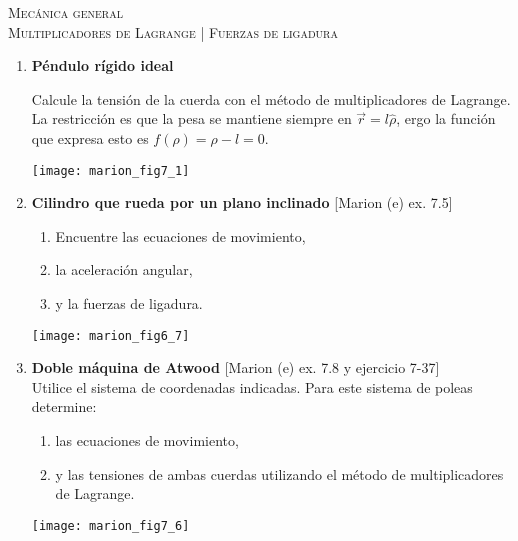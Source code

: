 \documentclass[11pt,spanish,a4paper]{article}
\begin{document}
\begin{center}
  \textsc{\large Mecánica general}\\
  \textsc{\large Multiplicadores de Lagrange | Fuerzas de ligadura}
\end{center}

\begin{enumerate}


	
\item \textbf{Péndulo rígido ideal}\\
\begin{minipage}[t][1.5cm]{0.85\textwidth}
Calcule la tensión de la cuerda con el método de multiplicadores de Lagrange.
La restricción es que la pesa se mantiene siempre en \(\vec{r} = l \hat{\rho}\), ergo la función que expresa esto es \(f(\rho) = \rho - l = 0\).
\end{minipage}
\begin{minipage}[c][3cm][t]{0.1\textwidth}
	\texttt{[image: marion\_fig7\_1]}
\end{minipage}



\item \textbf{Cilindro que rueda por un plano inclinado} [Marion (e) ex. 7.5]\\
\begin{minipage}[t][3.5cm]{0.7\textwidth}
	\begin{enumerate}
		\item Encuentre las ecuaciones de movimiento, 
		\item la aceleración angular,
		\item y la fuerzas de ligadura. 
	\end{enumerate}
\end{minipage}
\begin{minipage}[c][2cm][t]{0.25\textwidth}
	\texttt{[image: marion\_fig6\_7]}
\end{minipage}


	
\item
\begin{minipage}[t][5.5cm]{0.6\textwidth}
\textbf{Doble máquina de Atwood} [Marion (e) ex. 7.8 y ejercicio 7-37]\\
Utilice el sistema de coordenadas indicadas.
Para este sistema de poleas determine: 
\begin{enumerate}
	\item las ecuaciones de movimiento,
	\item y las tensiones de ambas cuerdas utilizando el método de multiplicadores de Lagrange.
\end{enumerate}
\end{minipage}
\begin{minipage}[c][4cm][t]{0.35\textwidth}
	\texttt{[image: marion\_fig7\_6]}
\end{minipage}




\end{enumerate}
\end{document}
